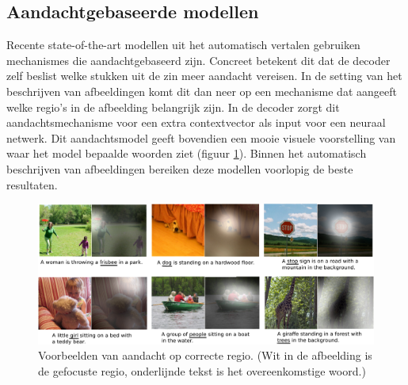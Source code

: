\subsection{Aandachtgebaseerde modellen}
Recente state-of-the-art modellen uit het automatisch vertalen gebruiken mechanismes die aandachtgebaseerd zijn. Concreet betekent dit dat de decoder zelf beslist welke stukken uit de zin meer aandacht vereisen.
In de setting van het beschrijven van afbeeldingen komt dit dan neer op een mechanisme dat aangeeft welke regio's in de afbeelding belangrijk zijn. In de decoder zorgt dit aandachtsmechanisme voor een extra contextvector als input voor een neuraal netwerk. Dit aandachtsmodel geeft bovendien een mooie visuele voorstelling van waar het model bepaalde woorden ziet (figuur \ref{fig:attention-example}). Binnen het automatisch beschrijven van afbeeldingen bereiken deze modellen\cite{Xu2015,Jin2015} voorlopig de beste resultaten.

\begin{figure}[tb]
	\centering
	\includegraphics[width=\linewidth]{Images/good_Xu.pdf}
	\caption{Voorbeelden van aandacht op correcte regio. (Wit in de afbeelding is de gefocuste regio, onderlijnde tekst is het overeenkomstige woord.)\cite{Xu2015}}
	\label{fig:attention-example}
\end{figure}


